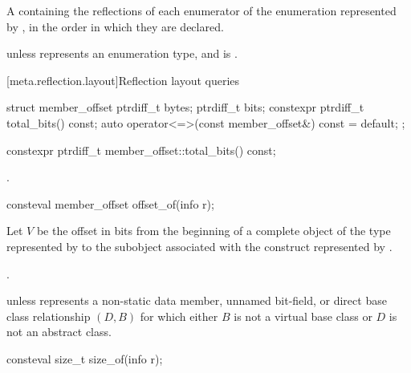 \begin{itemdescr}
\pnum
\returns
A  containing the reflections of each enumerator
of the enumeration represented by ,
in the order in which they are declared.

\pnum
\throws
{} unless
 represents an enumeration type,
and  is .
\end{itemdescr}

[meta.reflection.layout]{Reflection layout queries}

%
%
\begin{itemdecl}
struct member_offset {
  ptrdiff_t bytes;
  ptrdiff_t bits;
  constexpr ptrdiff_t total_bits() const;
  auto operator<=>(const member_offset&) const = default;
};

constexpr ptrdiff_t member_offset::total_bits() const;
\end{itemdecl}

\begin{itemdescr}
\pnum
\returns
{}.
\end{itemdescr}

%
\begin{itemdecl}
consteval member_offset offset_of(info r);
\end{itemdecl}

\begin{itemdescr}
\pnum
Let $V$ be the offset in bits from the beginning of a complete object
of the type represented by 
to the subobject associated with the construct represented by .

\pnum
\returns
{}.

\pnum
\throws
{} unless
 represents a non-static data member,
unnamed bit-field, or
direct base class relationship $(D, B)$
for which either $B$ is not a virtual base class
or $D$ is not an abstract class.
\end{itemdescr}

%
\begin{itemdecl}
consteval size_t size_of(info r);
\end{itemdecl}

